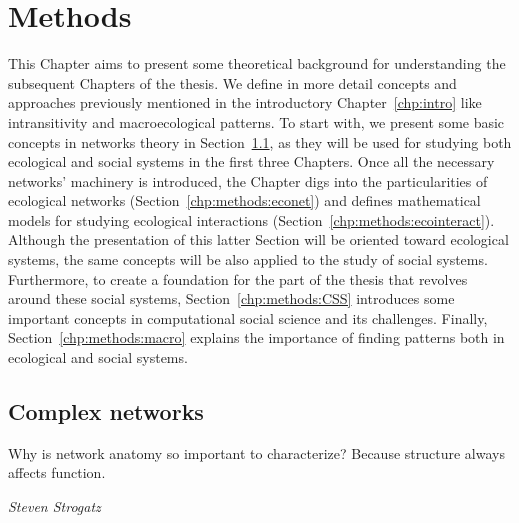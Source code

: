 \chapter{Methods}\label{chp:methods}
This Chapter aims to present some theoretical background for understanding the subsequent Chapters of the thesis. We define in more detail concepts and approaches previously mentioned in the introductory Chapter~\ref{chp:intro} like intransitivity and macroecological patterns. To start with, we present some basic concepts in networks theory in Section~\ref{chp:methods:networks}, as they will be used for studying both ecological and social systems in the first three Chapters. Once all the necessary networks' machinery is introduced, the Chapter digs into the particularities of ecological networks (Section~\ref{chp:methods:econet}) and defines mathematical models for studying ecological interactions (Section~\ref{chp:methods:ecointeract}). Although the presentation of this latter Section will be oriented toward ecological systems, the same concepts will be also applied to the study of social systems. Furthermore, to create a foundation for the part of the thesis that revolves around these social systems, Section~\ref{chp:methods:CSS} introduces some important concepts in computational social science and its challenges. Finally, Section~\ref{chp:methods:macro} explains the importance of finding patterns both in ecological and social systems.  \\

\section{Complex networks}\label{chp:methods:networks}
\epigraph{Why is network anatomy so important to characterize? Because structure always affects function.}{\textit{Steven Strogatz} \cite{strogatz2001exploring}}


